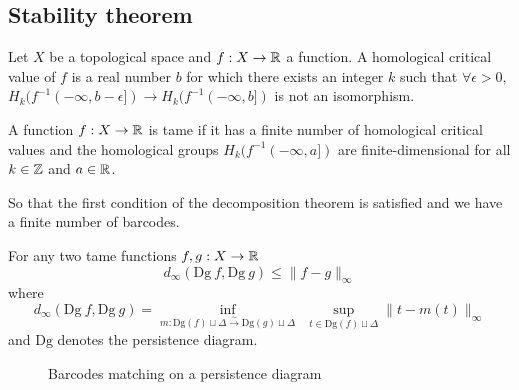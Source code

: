 \subsection{Stability theorem}

\newcommand{\Dg}{\mathrm{Dg}}

\begin{definition}
  Let $X$ be a topological space and $f : X \to \mathbb{R}$ a function.
  A homological critical value of $f$ is a real number $b$ for which
  there exists an integer $k$ such that $\forall \epsilon > 0, $
  $H_k(f^{-1}(-\infty, b-\epsilon]) \to H_k(f^{-1}(-\infty, b])$ is not
  an isomorphism.
\end{definition}

\begin{definition}[Tame]
  A function $f : X \to \mathbb{R}$ is tame if it has a finite number of homological
  critical values and the homological groups $H_k(f^{-1}(-\infty, a])$ are finite-dimensional
  for all $k\in\mathbb{Z}$ and $a\in\mathbb{R}$.
\end{definition}
\RM So that the first condition of the decomposition theorem is satisfied
and we have a finite number of barcodes.

\begin{theorem}
  For any two tame functions $f, g : X \to \mathbb{R}$
  $$
  d_\infty(\Dg~f, \Dg~g) \le \|f-g\|_\infty
  $$
  where
  $$
  d_\infty(\Dg~f, \Dg~g) =
  \inf_{m : \Dg(f)\sqcup \Delta \stackrel{\sim}{\to} \Dg(g)\sqcup \Delta}
  ~~
  \sup_{t\in \Dg(f)\sqcup \Delta} \|t-m(t)\|_\infty
  $$
  and $\Dg$ denotes the persistence diagram.
\end{theorem}

\begin{figure}
\centering
{}
\caption{Barcodes matching on a persistence diagram}
\label{fig:persistence diagram domaine}
\end{figure}

